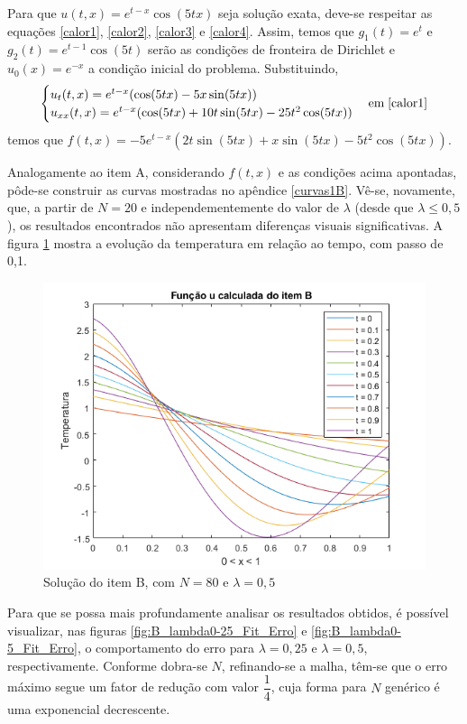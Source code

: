 \documentclass[12pt]{article}
\begin{document}
\begin{spacing}{1.5}
Para que $u(t,x)=e^{t-x}\cos(5tx)$ seja solução exata, deve-se respeitar as equações \eqref{calor1}, \eqref{calor2}, \eqref{calor3} e \eqref{calor4}. Assim, temos que $g_{1}(t) = e^{t}$ e $g_{2}(t) = e^{t-1}\cos(5t)$ serão as condições de fronteira de Dirichlet e $u_{0}(x) = e^{-x}$ a condição inicial do problema. Substituindo,
\begin{equation*}
\begin{cases}
    u_{t}(t,x)=e^{t-x}(\cos(5tx)-5x\sin(5tx)) \\
    u_{xx}(t,x)=e^{t-x}(\cos(5tx)+10t\sin(5tx)-25t^{2}\cos(5tx))
\end{cases} \text{em} \; \eqref{calor1}
\end{equation*}
temos que $ f(t,x)=-5e^{t-x}(2t\sin(5tx)+x\sin(5tx)-5t^{2}\cos(5tx))$.

Analogamente ao item A, considerando $f(t,x)$ e as condições acima apontadas, pôde-se construir as curvas mostradas no apêndice \ref{curvas1B}. Vê-se, novamente, que, a partir de $N=20$ e independementemente do valor de $\lambda$ (desde que $\lambda \leq 0,5$), os resultados encontrados não apresentam diferenças visuais significativas. A figura \ref{fig:itemB_2D} mostra a evolução da temperatura em relação ao tempo, com passo de 0,1.

\begin{figure}[ht!]
    \centering
    \includegraphics[width=0.8\linewidth]{Primeira_Tarefa/ItemB/itemB_2D.png}
    \caption{Solução do item B, com $N=80$ e $\lambda=0,5$}
    \label{fig:itemB_2D}
\end{figure}

Para que se possa mais profundamente analisar os resultados obtidos, é possível visualizar, nas figuras \ref{fig:B_lambda0-25_Fit_Erro} e \ref{fig:B_lambda0-5_Fit_Erro}, o comportamento do erro para $\lambda = 0,25$ e $\lambda = 0,5$, respectivamente. Conforme dobra-se $N$, refinando-se a malha, têm-se que o erro máximo segue um fator de redução com valor $\dfrac{1}{4}$, cuja forma para $N$ genérico é uma exponencial decrescente.


\end{spacing}
\end{document}
